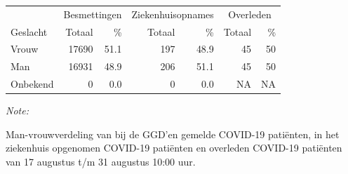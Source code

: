 \documentclass[
  english,
  man,floatsintext]{apa6}
\begin{document}
\begin{table}
\centering\begingroup\fontsize{11}{13}\selectfont

\begin{threeparttable}
\begin{tabular}{lrrrrrr}
\toprule
\multicolumn{1}{c}{ } & \multicolumn{2}{c}{Besmettingen} & \multicolumn{2}{c}{Ziekenhuisopnames} & \multicolumn{2}{c}{Overleden} \\
\cmidrule(l{3pt}r{3pt}){2-3} \cmidrule(l{3pt}r{3pt}){4-5} \cmidrule(l{3pt}r{3pt}){6-7}
Geslacht & Totaal & \% & Totaal & \% & Totaal & \%\\
\midrule
Vrouw & 17690 & 51.1 & 197 & 48.9 & 45 & 50\\
Man & 16931 & 48.9 & 206 & 51.1 & 45 & 50\\
Onbekend & 0 & 0.0 & 0 & 0.0 & NA & NA\\
\bottomrule
\end{tabular}
\begin{tablenotes}
\item \textit{Note: } 
\item Man-vrouwverdeling van bij de GGD’en gemelde COVID-19 patiënten, in het ziekenhuis opgenomen COVID-19 patiënten en overleden COVID-19 patiënten van 17 augustus t/m 31 augustus 10:00 uur.
\end{tablenotes}
\end{threeparttable}
\endgroup{}
\end{table}
\newpage
\end{document}

